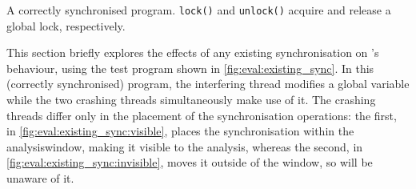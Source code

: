 \begin{sanefig}
  \vspace{-12pt}
  \caption{A correctly synchronised program.  \texttt{lock()} and
    \texttt{unlock()} acquire and release a global lock,
    respectively.}
  \label{fig:eval:existing_sync}
\end{sanefig}

\noindent
This section briefly explores the effects of any existing
synchronisation on {\technique}'s behaviour, using the test program
shown in \autoref{fig:eval:existing_sync}.  In this (correctly
synchronised) program, the interfering thread modifies a global
variable while the two crashing threads simultaneously make use of it.
The crashing threads differ only in the placement of the
synchronisation operations: the first, in
\autoref{fig:eval:existing_sync:visible}, places the synchronisation
within the \gls{analysiswindow}, making it visible to the {\technique}
analysis, whereas the second, in
\autoref{fig:eval:existing_sync:invisible}, moves it outside of the
window, so {\technique} will be unaware of it.

